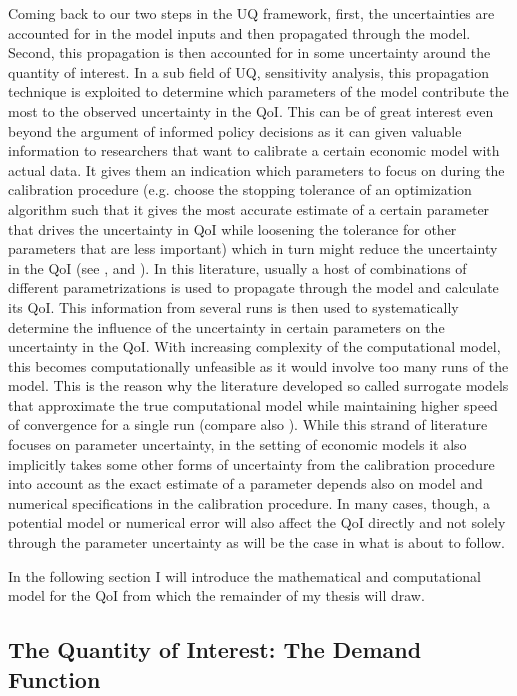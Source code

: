 Coming back to our two steps in the UQ framework, first, the uncertainties are accounted for in the model inputs and then propagated through the model. Second, this propagation is then accounted for in some uncertainty around the quantity of interest. In a sub field of UQ, sensitivity analysis, this propagation technique is exploited to determine which parameters of the model contribute the most to the observed uncertainty in the QoI. This can be of great interest even beyond the argument of informed policy decisions as it can given valuable information to researchers that want to calibrate a certain economic model with actual data. It gives them an indication which parameters to focus on during the calibration procedure (e.g. choose the stopping tolerance of an optimization algorithm such that it gives the most accurate estimate of a certain parameter that drives the uncertainty in QoI while loosening the tolerance for other parameters that are less important) which in turn might reduce the uncertainty in the QoI (see \cite{Scheidegger.2019},  \cite{Harenberg.2019} and \cite{Ghanem.2017}). In this literature, usually a host of combinations of different parametrizations is used to propagate through the model and calculate its QoI. This information from several runs is then used to systematically determine the influence of the uncertainty in certain parameters on the uncertainty in the QoI. With increasing complexity of the computational model, this becomes computationally unfeasible as it would involve too many runs of the model. This is the reason why the literature developed so called surrogate models that approximate the true computational model while maintaining higher speed of convergence for a single run (compare also \cite{Saltelli.2008}). While this strand of literature focuses on parameter uncertainty, in the setting of economic models it also implicitly takes some other forms of uncertainty from the calibration procedure into account as the exact estimate of a parameter depends also on model and numerical specifications in the calibration procedure. In many cases, though, a potential model or numerical error will also affect the QoI directly and not solely through the parameter uncertainty as will be the case in what is about to follow.

In the following section I will introduce the mathematical and computational model for the QoI from which the remainder of my thesis will draw.

\subsection{The Quantity of Interest: The Demand Function}

